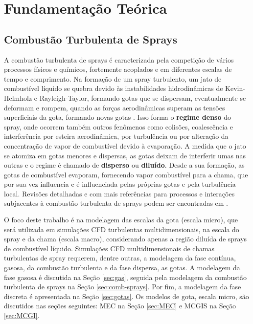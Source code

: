 \section{Fundamentação Teórica}


\subsection{Combustão Turbulenta de Sprays} \label{sec:teoria}

A combustão turbulenta de sprays é caracterizada pela competição de vários processos físicos e químicos, fortemente acoplados e em diferentes escalas de tempo e comprimento. 
Na formação de um spray turbulento, um jato de combustível líquido se quebra devido às instabilidades hidrodinâmicas de Kevin-Helmholz e Rayleigh-Taylor, formando gotas que se dispersam, eventualmente se deformam e rompem, quando as forças aerodinâmicas superam as tensões superficiais da gota, formando novas gotas \cite{JennyB2012}.
Isso forma o \textbf{regime denso} do spray, onde ocorrem também outros fenômenos como colisões, coalescência e interferência por esteira aerodinâmica, por turbulência ou por alteração da concentração de vapor de combustível devido à evaporação.
A medida que o jato se atomiza em gotas menores e dispersas, as gotas deixam de interferir umas nas outras e o regime é chamado de \textbf{disperso} ou \textbf{diluído}. 
Desde a sua formação, as gotas de combustível evaporam, fornecendo vapor combustível para a chama, que por sua vez influencia e é influenciada pelas próprias gotas e pela turbulência local.
Revisões detalhadas e com mais referências para processos e interações subjacentes à combustão turbulenta de sprays podem ser encontradas em \cite{JennyB2012, MasriA2016, SanchezA2015, ZhouL2021,JiangX2010}.

O foco deste trabalho é na modelagem das escalas da gota (escala micro), que será utilizada em simulações CFD turbulentas multidimensionais, na escala do spray e da chama (escala macro), considerando apenas a região diluída de sprays de combustível líquido.
Simulações CFD multidimensionais de chamas turbulentas de spray requerem, dentre outras, a modelagem da fase contínua, gasosa, da combustão turbulenta e da fase dispersa, as gotas.
A modelagem da fase gasosa é discutida na Seção \ref{sec:gas}, seguida pela modelagem da combustão turbulenta de sprays na Seção \ref{sec:comb-sprays}. 
Por fim, a modelagem da fase discreta é apresentada na Seção \ref{sec:gotas}.
Os modelos de gota, escala micro, são discutidos nas seções seguintes: MEC na Seção	\ref{sec:MEC} e MCGIS na Seção \ref{sec:MCGI}.
